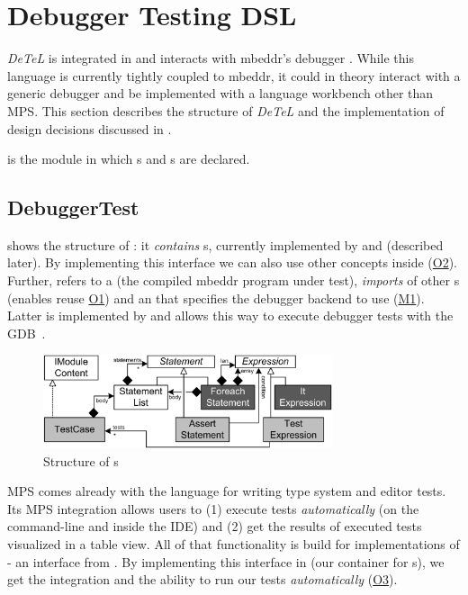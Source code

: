 \section{Debugger Testing DSL}

\emph{DeTeL} is integrated in  and interacts
with mbeddr's debugger . While this language is currently tightly
coupled to mbeddr, it could in theory interact with a generic debugger 
and be implemented with a language workbench other than \ac{MPS}.
This section describes the structure of \emph{DeTeL} and the
implementation of design decisions discussed in .

 is the module in which s and
s are declared. 


\subsection{DebuggerTest}

 shows the structure of : 
it \emph{contains} s, currently implemented by 
 and  (described later). By
implementing this interface we can also use other concepts inside
 (\hyperref[O2]{O2}). Further,  refers to 
a  (the compiled mbeddr program under test), \emph{imports} of other
s (enables reuse \hyperref[O1]{O1}) and an
 that specifies the debugger backend to use
(\hyperref[M1]{M1}). Latter is implemented by  and allows this
way to execute debugger tests with the \ac{GDB}~\cite{gdb}.

\begin{figure}[h]
  \vspace{-2mm}
  \centering
    \includegraphics[width=8.5cm]{./figures/umldiag.png} 
    \vspace{-2mm}
    \caption{Structure of s}
  \label{fig:DebuggerTestStructure}
  \vspace{-2mm}
\end{figure}

\ac{MPS} comes already with the language  for writing type
system and editor tests. Its \ac{MPS} integration allows users to (1) execute
tests \emph{automatically} (on the command-line and inside the \ac{IDE}) and 
(2) get the results of
executed tests visualized in a table view. All of that functionality is build
for implementations of  - an interface from . By
implementing this interface in  (our container for
s), we get the  integration and the ability to
run our tests \emph{automatically} (\hyperref[O3]{O3}).



